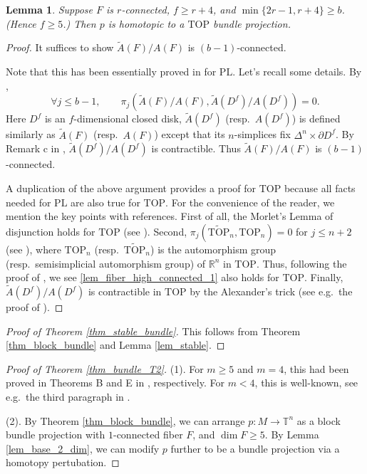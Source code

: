 \documentclass[12pt]{amsart}
\theoremstyle{plain}
\newtheorem{lemma}[theorem]{Lemma}
\theoremstyle{definition}
\theoremstyle{question}
\theoremstyle{remark}
\theoremstyle{assumption}
\numberwithin{equation}{section}
\theoremstyle{bigthm}
\begin{document}
\begin{lemma}\label{lem_fiber_high_connected}
Suppose $F$ is $r$-connected, $f \ge r+4$, and $\min \{ 2r-1, r+4 \} \ge b$. (Hence $f \ge 5$.) Then $p$ is homotopic to a $\mathrm{TOP}$ bundle projection.
\end{lemma}
\begin{proof}
It suffices to show $\tilde{A} (F) / A(F)$ is $(b-1)$-connected.

Note that this has been essentially proved in \cite{BLR1975} for $\mathrm{PL}$. Let's recall some details. By \cite[Corollary~3.2]{BLR1975},
\begin{equation}\label{lem_fiber_high_connected_1}
\forall j \le b-1, \qquad \pi_{j} (\tilde{A} (F) / A(F), \tilde{A} (D^{f}) / A(D^{f})) =0.
\end{equation}
Here $D^{f}$ is an $f$-dimensional closed disk, $\tilde{A} (D^{f})$ (resp.~$A(D^{f})$) is defined similarly as $\tilde{A} (F)$ (resp.~$A(F)$) except that its $n$-simplices fix $\Delta^{n} \times \partial D^{f}$. By Remark c in \cite[p.~30]{BLR1975}, $\tilde{A} (D^{f}) / A(D^{f})$ is contractible. Thus $\tilde{A} (F) / A(F)$ is $(b-1)$-connected.

A duplication of the above argument provides a proof for $\mathrm{TOP}$ because all facts needed for $\mathrm{PL}$ are also true for $\mathrm{TOP}$. For the convenience of the reader, we mention the key points with references. First of all, the Morlet's Lemma of disjunction holds for $\mathrm{TOP}$ (see \cite[p.~142]{BLR1975}). Second, $\pi_{j} (\widetilde{\mathrm{TOP}}_{n}, \mathrm{TOP}_{n}) =0$ for $j \le n+2$ (see \cite[Proposition~5.6]{Burghelea_Lashof}), where $\mathrm{TOP}_{n}$ (resp.~$\widetilde{\mathrm{TOP}}_{n}$) is the automorphism group (resp.~semisimplicial automorphism group) of $\mathbb{R}^{n}$ in $\mathrm{TOP}$. Thus, following the proof of \cite[Corollary~3.2]{BLR1975}, we see \eqref{lem_fiber_high_connected_1} also holds for $\mathrm{TOP}$. Finally, $\tilde{A} (D^{f}) / A(D^{f})$ is contractible in $\mathrm{TOP}$ by the Alexander's trick (see e.g.~the proof of \cite[Lemma~5.1]{Browder66}).
\end{proof}

\begin{proof}[Proof of Theorem \ref{thm_stable_bundle}]
This follows from Theorem \ref{thm_block_bundle} and Lemma \ref{lem_stable}.
\end{proof}

\begin{proof}[Proof of Theorem \ref{thm_bundle_T2}]
(1).  For $m \ge 5$ and $m=4$, this had been proved in Theorems B and E in \cite{Qin_Su_Wang}, respectively. For $m<4$, this is well-known, see e.g.~the third paragraph in \cite[p.~1887]{Qin_Su_Wang}.

(2). By Theorem \ref{thm_block_bundle}, we can arrange $p \colon  M \rightarrow \mathbb{T}^{n}$ as a block bundle projection with $1$-connected fiber $F$, and $\dim F \ge 5$. By Lemma \ref{lem_base_2_dim}, we can modify $p$ further to be a bundle projection via a homotopy pertubation.
\end{proof}
\end{document}
